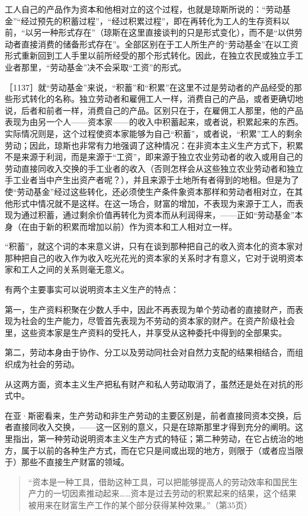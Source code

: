 工人自己的产品作为资本和他相对立的这个过程，也就是琼斯所说的：“劳动基金”“经过预先的积蓄过程”，“经过积累过程”，即在再转化为工人的生存资料以前，“以另一种形式存在”（琼斯在这里直接谈判的只是形式变化），而不是“以供劳动者直接消费的储备形式存在”。全部区别在于工人所生产的“劳动基金”在以工资形式重新回到工人手里以前所经受的那个形式转化。因此，在独立农民或独立手工业者那里，“劳动基金”决不会采取“工资”的形式。

［1137］就“劳动基金”来说，“积蓄”和“积累”在这里不过是劳动者的产品经受的那些形式转化的名称。独立劳动者和雇佣工人一样，消费自己的产品，或者更确切地说，后者和前者一样，消费自己的产品。区别只在于，在雇佣工人那里，他的产品表现为由另一个人——资本家——的收入中积蓄起来，或者说，积累起来的东西。实际情况则是，这个过程使资本家能够为自己“积蓄”，或者说，“积累”工人的剩余劳动；因此，琼斯也非常有力地强调了这种情况：在非资本主义生产方式下，积累不是来源于利润，而是来源于“工资”，即来源于独立农业劳动者的收入或用自己的劳动直接同收入交换的手工业者的收入（否则怎样会从这些独立农业劳动者和独立手工业者当中产生出资产者呢？），并且来源于土地所有者得到的地租。但是为了使“劳动基金”经过这些转化，还必须使生产条件象资本那样和劳动者相对立，在其他形式中情况就不是这样。在这一场合，财富的增加，不表现为来源于工人，而表现为通过积蓄，通过剩余价值再转化为资本而从利润得来，——正如“劳动基金”本身（在由于新的积累而增加以前）作为资本和工人相对立一样。

“积蓄”，就这个词的本来意义讲，只有在谈到那种把自己的收入资本化的资本家对那种把自己的收入作为收入吃光花光的资本家的关系时才有意义，它对于说明资本家和工人之间的关系则毫无意义。

有两个主要事实可以说明资本主义生产的特点：

第一，生产资料积聚在少数人手中，因此不再表现为单个劳动者的直接财产，而表现为社会的生产能力，尽管首先表现为不劳动的资本家的财产。在资产阶级社会里，这些资本家是生产资料的受托人，并享受从这种委托中得到的全部果实。

第二，劳动本身由于协作、分工以及劳动同社会对自然力支配的结果相结合，而组织成为社会的劳动。

从这两方面，资本主义生产把私有财产和私人劳动取消了，虽然还是处在对抗的形式中。

在亚·斯密看来，生产劳动和非生产劳动的主要区别是，前者直接同资本交换，后者直接同收入交换，——这一区别的意义，只是在琼斯那里才得到充分的阐明。这里指出，第一种劳动说明资本主义生产方式的特征；第二种劳动，在它占统治的地方，属于以前的各种生产方式，而在它只是间或出现的地方，则限于（或者应当限于）那些不直接生产财富的领域。

\begin{quote}{“资本是一种工具，借助这种工具，可以把能够提高人的劳动效率和国民生产力的一切因素推动起来……资本是过去劳动的积累起来的结果，这个结果被用来在财富生产工作的某个部分获得某种效果。”（第35页）}\end{quote}

